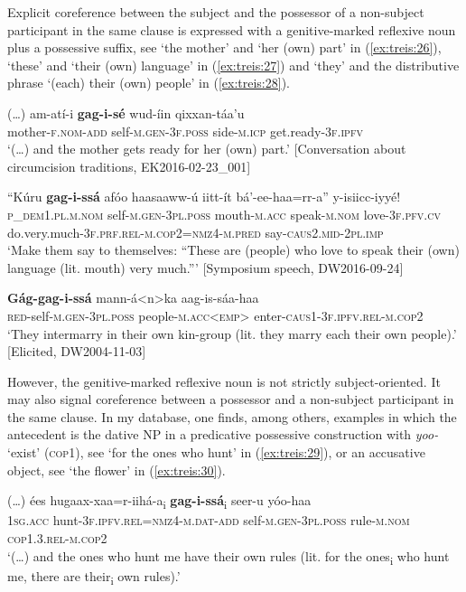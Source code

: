\documentclass[output=paper]{langscibook}
\begin{document}
Explicit coreference between the subject and the possessor of a non-subject participant in the same clause is expressed with a genitive-marked reflexive noun plus a possessive suffix, see ‘the mother’ and ‘her (own) part’ in (\ref{ex:treis:26}), ‘these’ and ‘their (own) language’ in (\ref{ex:treis:27}) and ‘they’ and the distributive phrase ‘(each) their (own) people’ in (\ref{ex:treis:28}).

\ea\label{ex:treis:26} 
\gll (…) am-atí-i \textbf{gag-i-sé} wud-íin qixxan-táa’u\\
     {} mother-\textsc{f.nom-add} self-\textsc{m.gen-3f.poss} side-\textsc{m.icp} get.ready-\textsc{3f.ipfv}\\
\glt ‘(…) and the mother gets ready for her (own) part.’ [Conversation about circumcision traditions, EK2016-02-23\_001]\z

\ea\label{ex:treis:27} 
\gll “Kúru \textbf{gag-i-ssá} afóo haasaaww-ú iitt-ít bá’-ee-haa=rr-a” y-isiicc-iyyé!\\
     {\db}\textsc{p\_dem1.pl.m.nom} self-\textsc{m.gen-3pl.poss} mouth-\textsc{m.acc} speak\textsc{-m.nom} love-\textsc{3f.pfv.cv} do.very.much-\textsc{3f.prf.rel-m.cop2=nmz4-m.pred} say-\textsc{caus2.mid-2pl.imp}\\
\glt ‘Make them say to themselves: “These are (people) who love to speak their (own) language (lit. mouth) very much.”’ [Symposium speech, DW2016-09-24]\z

\ea\label{ex:treis:28}
\gll \textbf{Gág-gag-i-ssá} mann-á<n>ka aag-is-sáa-haa\\
     \textsc{red-}self-\textsc{m.gen-3pl.poss} people-\textsc{m.acc<emp>} enter-\textsc{caus1-3f.ipfv.rel-m.cop2}\\
\glt ‘They intermarry in their own kin-group (lit. they marry each their own people).’ [Elicited, DW2004-11-03]\z

However, the genitive-marked reflexive noun is not strictly subject-oriented. It may also signal coreference between a possessor and a non-subject participant in the same clause. In my database, one finds, among others, examples in which the antecedent is the dative NP in a predicative possessive construction with \textit{yoo-} ‘exist’ (\textsc{cop1)}, see ‘for the ones who hunt’ in (\ref{ex:treis:29}), or an accusative object, see ‘the flower’ in (\ref{ex:treis:30}).

\ea\label{ex:treis:29} 
\gll (…) ées hugaax-xaa=r-iihá-a\textup{\textsubscript{i}} \textbf{gag-i-ssá}\textup{\textsubscript{i}} seer-u yóo-haa\\
     {} \textsc{1sg.acc} hunt-\textsc{3f.ipfv.rel=nmz4-m.dat-add} self-\textsc{m.gen-3pl.poss} rule-\textsc{m.nom} \textsc{cop1.3.rel-m.cop2}\\
\glt ‘(…) and the ones who hunt me have their own rules (lit. for the ones\textsubscript{i} who hunt me, there are their\textsubscript{i} own rules).’ \citep[70]{Saint-Exupéry2018}\z
\end{document}
